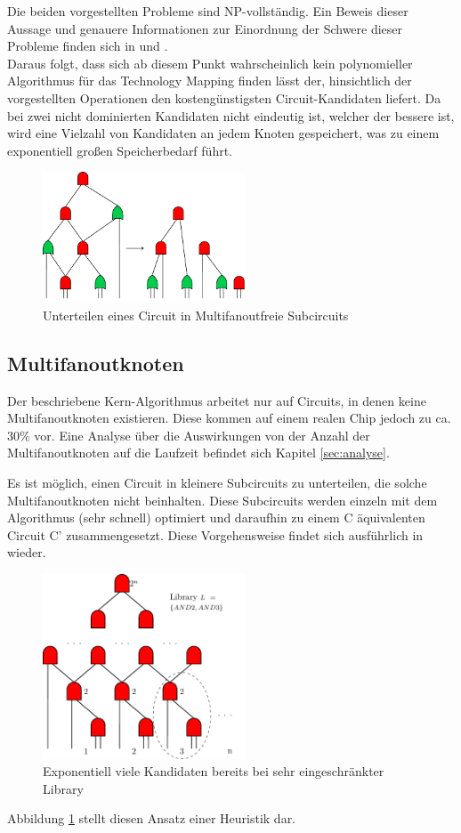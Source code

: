 \documentclass[11pt, a4paper, german]{article}
\newcommand{\TM}{Technology  Mapping }
\begin{document}
Die beiden vorgestellten Probleme sind NP-vollständig. Ein Beweis dieser Aussage und genauere Informationen zur Einordnung der Schwere dieser Probleme finden sich in \cite{ComplexitySynthesis} und \citep{Elbert}. \\
Daraus folgt, dass sich ab diesem Punkt wahrscheinlich  kein polynomieller Algorithmus für das \TM finden lässt der, hinsichtlich der vorgestellten Operationen den kostengünstigsten Circuit-Kandidaten liefert.
Da bei zwei nicht dominierten Kandidaten nicht eindeutig ist, welcher der bessere ist,  wird eine Vielzahl von Kandidaten an jedem Knoten gespeichert, was zu einem exponentiell großen Speicherbedarf führt. 
 \begin{figure}
		\includegraphics[width = 6cm]{pictures/compiled/ohne_highfanout_heu}
		\caption{Unterteilen eines Circuit in Multifanoutfreie Subcircuits}
		\label{bild:ohne_multifanout_heu}
\end{figure}
\subsection{Multifanoutknoten}
\label{subsec:multifanout}
Der beschriebene Kern-Algorithmus arbeitet nur auf Circuits, in denen keine Multifanoutknoten existieren. Diese kommen auf einem realen Chip jedoch zu ca. $30\%$ vor.
Eine Analyse über die Auswirkungen von der Anzahl der Multifanoutknoten auf die Laufzeit befindet sich Kapitel \ref{sec:analyse}.

Es ist möglich, einen Circuit in kleinere Subcircuits zu unterteilen, die solche Multifanoutknoten nicht beinhalten. Diese Subcircuits werden einzeln mit dem Algorithmus (sehr schnell) optimiert und daraufhin zu einem C äquivalenten Circuit C' zusammengesetzt. Diese Vorgehensweise findet sich ausführlich in \cite{DAGON} wieder. 
   \begin{figure}%
\includegraphics[width= 6cm]{pictures/compiled/expo_kand}
\caption{Exponentiell viele Kandidaten bereits bei sehr eingeschränkter Library}
\label{bild:expo_kan}
\end{figure}
Abbildung \ref{bild:ohne_multifanout_heu} stellt diesen Ansatz einer Heuristik dar. \\
\end{document}

